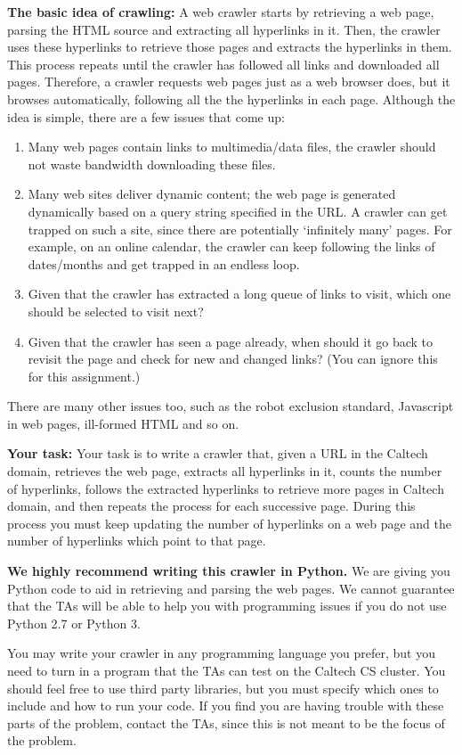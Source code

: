 \documentclass[11pt]{article}
\begin{document}
 {\bf The basic idea of crawling:} A web crawler starts by
retrieving a web page, parsing the HTML source and extracting all
hyperlinks in it.  Then, the crawler uses these hyperlinks to retrieve
those pages and extracts the hyperlinks in them. This process repeats
until the crawler has followed all links and downloaded all
pages. Therefore, a crawler requests web pages just as a web browser
does, but it browses automatically, following all the the hyperlinks
in each page. Although the idea is simple, there are a few issues that
come up:
\begin{enumerate}
\item Many web pages contain links to multimedia/data files, the
  crawler should not waste bandwidth downloading these files.
\item Many web sites deliver dynamic content; the web page is
  generated dynamically based on a query string specified in the
  URL. A crawler can get trapped on such a site, since there are
  potentially `infinitely many' pages. For example, on an online
  calendar, the crawler can keep following the links of dates/months
  and get trapped in an endless loop.
\item Given that the crawler has extracted a long queue of links to
  visit, which one should be selected to visit next?
\item Given that the crawler has seen a page already, when should it
  go back to revisit the page and check for new and changed links?
  (You can ignore this for this assignment.)
\end{enumerate}
There are many other issues too, such as the robot exclusion standard,
Javascript in web pages, ill-formed HTML and so on.

{\bf Your task:}  Your task is to write a crawler
that, given a URL in the Caltech domain, retrieves the web page,
extracts all hyperlinks in it, counts the number of hyperlinks,
follows the extracted hyperlinks to retrieve more pages in Caltech
domain, and then repeats the process for each successive page. During
this process you must keep updating the number of hyperlinks on a web
page and the number of hyperlinks which point to that page.

\textbf{We highly recommend writing this crawler in Python.} We are giving you Python code to aid in retrieving and parsing the web pages. We cannot guarantee that the TAs will be able to help you with programming issues if you do not use Python 2.7 or Python 3.

You may write your crawler in any programming language you prefer, but
you need to turn in a program that the TAs can test on the Caltech CS
cluster. You should feel free to use third party libraries, but you must specify which ones to include and how to run your code. If you find you are having trouble with these parts of the problem, contact the TAs, since this is not meant to be the focus of the problem.
\end{document}
